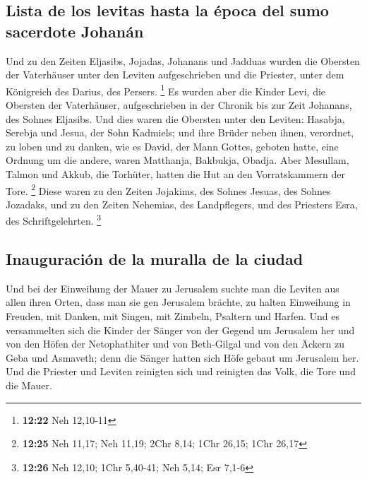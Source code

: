 \hypertarget{lista-de-los-levitas-hasta-la-uxe9poca-del-sumo-sacerdote-johanuxe1n}{%
\subsection{Lista de los levitas hasta la época del sumo sacerdote
Johanán}\label{lista-de-los-levitas-hasta-la-uxe9poca-del-sumo-sacerdote-johanuxe1n}}

 Und zu den Zeiten Eljasibs, Jojadas, Johanans und
Jadduas wurden die Obersten der Vaterhäuser unter den Leviten
aufgeschrieben und die Priester, unter dem Königreich des Darius, des
Persers. \footnote{\textbf{12:22} Neh 12,10-11}  Es
wurden aber die Kinder Levi, die Obersten der Vaterhäuser,
aufgeschrieben in der Chronik bis zur Zeit Johanans, des Sohnes
Eljasibs.  Und dies waren die Obersten unter den Leviten:
Hasabja, Serebja und Jesua, der Sohn Kadmiels; und ihre Brüder neben
ihnen, verordnet, zu loben und zu danken, wie es David, der Mann Gottes,
geboten hatte, eine Ordnung um die andere,  waren
Matthanja, Bakbukja, Obadja. Aber Mesullam, Talmon und Akkub, die
Torhüter, hatten die Hut an den Vorratskammern der Tore. \footnote{\textbf{12:25}
  Neh 11,17; Neh 11,19; 2Chr 8,14; 1Chr 26,15; 1Chr 26,17}
 Diese waren zu den Zeiten Jojakims, des Sohnes Jesuas,
des Sohnes Jozadaks, und zu den Zeiten Nehemias, des Landpflegers, und
des Priesters Esra, des Schriftgelehrten. \footnote{\textbf{12:26} Neh
  12,10; 1Chr 5,40-41; Neh 5,14; Esr 7,1-6}

\hypertarget{inauguraciuxf3n-de-la-muralla-de-la-ciudad}{%
\subsection{Inauguración de la muralla de la
ciudad}\label{inauguraciuxf3n-de-la-muralla-de-la-ciudad}}

 Und bei der Einweihung der Mauer zu Jerusalem suchte man
die Leviten aus allen ihren Orten, dass man sie gen Jerusalem brächte,
zu halten Einweihung in Freuden, mit Danken, mit Singen, mit Zimbeln,
Psaltern und Harfen.  Und es versammelten sich die Kinder
der Sänger von der Gegend um Jerusalem her und von den Höfen der
Netophathiter  und von Beth-Gilgal und von den Äckern zu
Geba und Asmaveth; denn die Sänger hatten sich Höfe gebaut um Jerusalem
her.  Und die Priester und Leviten reinigten sich und
reinigten das Volk, die Tore und die Mauer.

